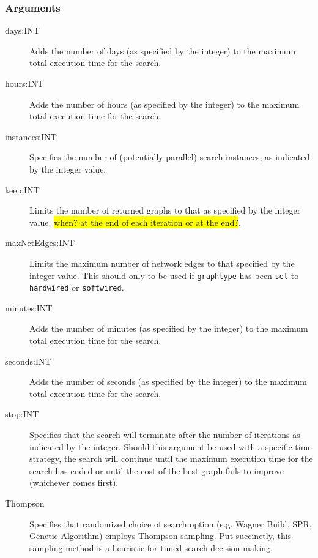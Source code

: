 	\subsubsection{Arguments}
	\begin{description}
		\item[days:INT] Adds the number of days (as specified by the integer) to the 
		maximum total execution time for the search.
		
		\item[hours:INT] Adds the number of hours (as specified by the integer) to the 
		maximum total execution time for the search.
		
		\item[instances:INT] Specifies the number of (potentially parallel) search instances,
		as indicated by the integer value.
		
		\item[keep:INT] Limits the number of returned graphs to that as specified by the 
		integer value. \hl{when? at the end of each iteration or at the end?}.
		
		\item[maxNetEdges:INT] Limits the maximum number of network edges to that
		specified by the integer value. This should only to be used if \texttt{graphtype}
		has been \texttt{set} to \texttt{hardwired} or \texttt{softwired}. 
		
		\item[minutes:INT] Adds the number of minutes (as specified by the integer) to 
		the maximum total execution time for the search.
		
		\item[seconds:INT] Adds the number of seconds (as specified by the integer) to the 
		maximum total execution time for the search.

		\item[stop:INT] Specifies that the search will terminate after the number of iterations 
		as indicated by the integer. Should this argument be used with a specific time strategy, 
		the search will continue until the maximum execution time for the search has ended
		or until the cost of the best graph fails to improve (whichever comes first).
		
		\item[Thompson] Specifies that randomized choice of search option (e.g. Wagner 
		Build, SPR, Genetic Algorithm) employs Thompson sampling. Put succinctly, this
		sampling method is a heuristic for timed search decision making.
				

\end{description}
